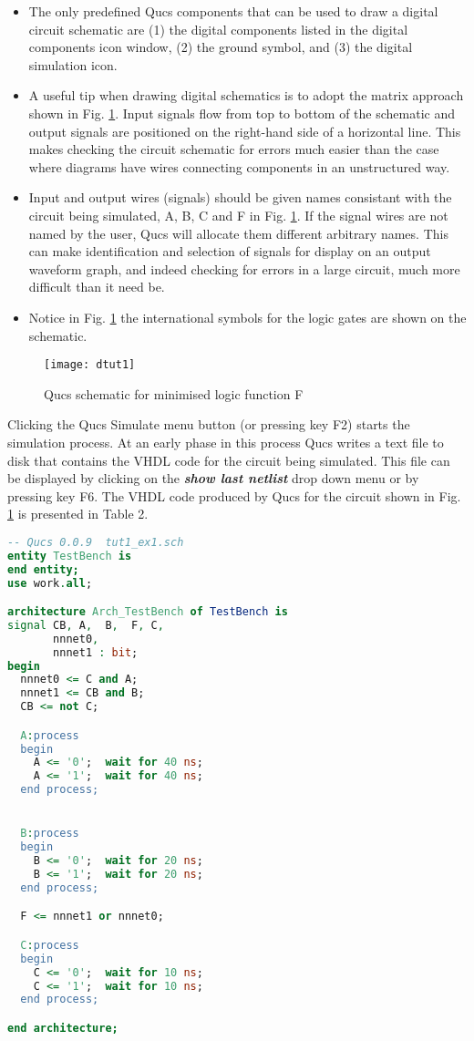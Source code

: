 \begin{itemize}
\item
The only predefined Qucs components that can be used to draw a digital
circuit schematic are (1) the digital components listed in the digital
components icon window, (2) the ground symbol, and (3) the digital
simulation icon.
\item
A useful tip when drawing digital schematics is to adopt the matrix
approach shown in Fig. \ref{fig:dtut1}. Input signals flow from top to
bottom of the schematic and output signals are positioned on the
right-hand side of a horizontal line. This makes checking the circuit
schematic for errors much easier than the case where diagrams have
wires connecting components in an unstructured way.
\item
Input and output wires (signals) should be given names consistant with
the circuit being simulated, A, B, C and F in Fig. \ref{fig:dtut1}.
If the signal wires are not named by the user, Qucs will allocate them
different arbitrary names.  This can make identification and selection
of signals for display on an output waveform graph, and indeed
checking for errors in a large circuit, much more difficult than it
need be.
\item
Notice in Fig. \ref{fig:dtut1} the international symbols for the logic
gates are shown on the schematic.
\end{itemize}

\begin{figure}[ht]
  \centering
  \texttt{[image: dtut1]}
  \caption{Qucs schematic for minimised logic function F}
  \label{fig:dtut1}
\end{figure} 


Clicking the Qucs Simulate menu button (or pressing key F2) starts the
simulation process. At an early phase in this process Qucs writes a
text file to disk that contains the VHDL code for the circuit being
simulated.  This file can be displayed by clicking on the
\textit{\textbf{show last netlist}} drop down menu or by pressing key
F6. The VHDL code produced by Qucs for the circuit shown in
Fig. \ref{fig:dtut1} is presented in Table 2.
\begin{lstlisting}[language=VHDL]
-- Qucs 0.0.9  tut1_ex1.sch
entity TestBench is
end entity;
use work.all;

architecture Arch_TestBench of TestBench is
signal CB, A,  B,  F, C, 
       nnnet0, 
       nnnet1 : bit;
begin
  nnnet0 <= C and A;
  nnnet1 <= CB and B;
  CB <= not C;

  A:process
  begin
    A <= '0';  wait for 40 ns;
    A <= '1';  wait for 40 ns;
  end process;


  B:process
  begin
    B <= '0';  wait for 20 ns;
    B <= '1';  wait for 20 ns;
  end process;

  F <= nnnet1 or nnnet0;

  C:process
  begin
    C <= '0';  wait for 10 ns;
    C <= '1';  wait for 10 ns;
  end process;

end architecture;
\end{lstlisting}

